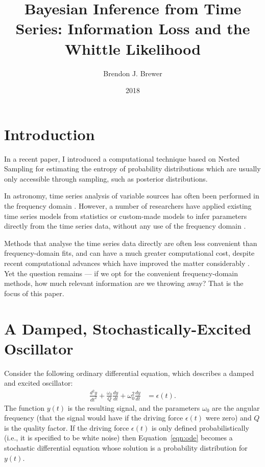 \documentclass[a4paper, 12pt]{article}
\title{Bayesian Inference from Time Series: Information Loss and the Whittle Likelihood}
\author{Brendon J. Brewer}
\date{2018}
\begin{document}
\maketitle


\setlength{\parindent}{0pt}
\setlength{\parskip}{1em}

\section{Introduction}

In a recent paper, I introduced a computational technique based on Nested
Sampling for estimating the entropy of probability distributions which are
usually only accessible through sampling, such as posterior distributions.

In astronomy, time series analysis of variable sources has often been performed
in the frequency domain \citep[e.g.][]{lomb, hatzes, helio}. However,
a number of researchers have applied existing time series models from
statistics \citep{brockwell_davis} or custom-made models to infer parameters
directly from the time series data, without any use of the frequency domain
\citep[e.g.][]{gregory_loredo, gregory, kelly, brewer_stello, farr}.

Methods that analyse the time series data directly are often less convenient than frequency-domain fits, and can have a much greater computational cost,
despite recent computational advances which have improved the matter
considerably \citep[e.g.][]{hodlr, celerite}. Yet the question remains ---
if we opt for the convenient frequency-domain methods, how much relevant
information are we throwing away? That is the focus of this paper.


\section{A Damped, Stochastically-Excited Oscillator}
Consider the following ordinary differential equation, which describes
a damped and excited oscillator:
\begin{align}
\frac{d^2y}{dt^2} + \frac{\omega_0}{Q}\frac{dy}{dt}
        + \omega_0^2\frac{dy}{dt} &= \epsilon(t).\label{eqn:ode}
\end{align}
The function $y(t)$ is the resulting signal, and the parameters $\omega_0$
are the angular frequency (that the signal would have if
the driving force $\epsilon(t)$ were zero) and $Q$ is the quality factor.
If the driving force $\epsilon(t)$ is only defined probabilistically (i.e.,
it is specified to be white noise) then Equation~\ref{eqn:ode} becomes a
stochastic differential equation whose solution is a probability distribution
for $y(t)$.
\end{document}

